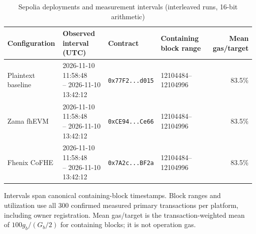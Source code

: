 \begin{table}[!t]
\caption{Sepolia deployments and measurement intervals (interleaved runs, 16-bit arithmetic)}
\label{tab:sepolia-experiment-deployments-blockintervals}
\centering
\footnotesize
\setlength{\tabcolsep}{4pt}
\begin{tabular}{|l|l|l|l|r|}
\hline
\textbf{Configuration} &
\textbf{Observed interval (UTC)} &
\textbf{Contract} &
\textbf{Containing block range} &
\textbf{Mean gas/target} \\
\hline
Plaintext baseline &
\shortstack[l]{2026-11-10 11:58:48 \\ -- 2026-11-10 13:42:12} &
\texttt{0x77F2...d015} &
12104484--12104996 &
83.5\% \\
\hline
Zama fhEVM &
\shortstack[l]{2026-11-10 11:58:48 \\ -- 2026-11-10 13:42:12} &
\texttt{0xCE94...Ce66} &
12104484--12104996 &
83.5\% \\
\hline
Fhenix CoFHE &
\shortstack[l]{2026-11-10 11:58:48 \\ -- 2026-11-10 13:42:12} &
\texttt{0x7A2c...BF2a} &
12104484--12104996 &
83.5\% \\
\hline
\end{tabular}
\vspace{2pt}
\parbox{\textwidth}{\scriptsize Intervals span canonical containing-block timestamps. Block ranges and utilization use all 300 confirmed measured primary transactions per platform, including owner registration. Mean gas/target is the transaction-weighted mean of $100g_b/(G_b/2)$ for containing blocks; it is not operation gas.}
\end{table}

